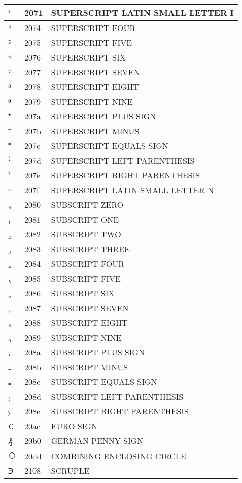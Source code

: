 \documentclass[12pt,letterpaper,openany]{book}
\begin{document}
\begin{center}
\begin{supertabular}{|m{0.25in}|m{0.5in}|m{4in}|}
			ⁱ & 2071 & SUPERSCRIPT LATIN SMALL LETTER I\\\hline
			⁴ & 2074 & SUPERSCRIPT FOUR\\\hline
			⁵ & 2075 & SUPERSCRIPT FIVE\\\hline
			⁶ & 2076 & SUPERSCRIPT SIX\\\hline
			⁷ & 2077 & SUPERSCRIPT SEVEN\\\hline
			⁸ & 2078 & SUPERSCRIPT EIGHT\\\hline
			⁹ & 2079 & SUPERSCRIPT NINE\\\hline
			⁺ & 207a & SUPERSCRIPT PLUS SIGN\\\hline
			⁻ & 207b & SUPERSCRIPT MINUS\\\hline
			⁼ & 207c & SUPERSCRIPT EQUALS SIGN\\\hline
			⁽ & 207d & SUPERSCRIPT LEFT PARENTHESIS\\\hline
			⁾ & 207e & SUPERSCRIPT RIGHT PARENTHESIS\\\hline
			ⁿ & 207f & SUPERSCRIPT LATIN SMALL LETTER N\\\hline
			₀ & 2080 & SUBSCRIPT ZERO\\\hline
			₁ & 2081 & SUBSCRIPT ONE\\\hline
			₂ & 2082 & SUBSCRIPT TWO\\\hline
			₃ & 2083 & SUBSCRIPT THREE\\\hline
			₄ & 2084 & SUBSCRIPT FOUR\\\hline
			₅ & 2085 & SUBSCRIPT FIVE\\\hline
			₆ & 2086 & SUBSCRIPT SIX\\\hline
			₇ & 2087 & SUBSCRIPT SEVEN\\\hline
			₈ & 2088 & SUBSCRIPT EIGHT\\\hline
			₉ & 2089 & SUBSCRIPT NINE\\\hline
			₊ & 208a & SUBSCRIPT PLUS SIGN\\\hline
			₋ & 208b & SUBSCRIPT MINUS\\\hline
			₌ & 208c & SUBSCRIPT EQUALS SIGN\\\hline
			₍ & 208d & SUBSCRIPT LEFT PARENTHESIS\\\hline
			₎ & 208e & SUBSCRIPT RIGHT PARENTHESIS\\\hline
			€ & 20ac & EURO SIGN\\\hline
			₰ & 20b0 & GERMAN PENNY SIGN\\\hline
			⃝ & 20dd & COMBINING ENCLOSING CIRCLE\\\hline
			℈ & 2108 & SCRUPLE\\\hline

\end{supertabular}
\end{center}
\end{document}

